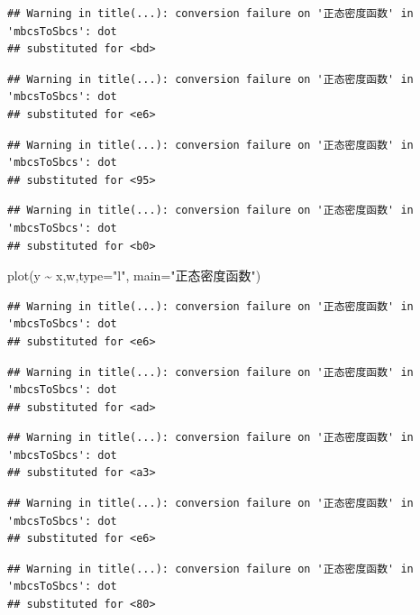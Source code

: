 \documentclass[
]{book}
\newenvironment{Shaded}{\begin{snugshade}}{\end{snugshade}}
\newcommand{\AttributeTok}[1]{\textcolor[rgb]{0.77,0.63,0.00}{#1}}
\newcommand{\FunctionTok}[1]{\textcolor[rgb]{0.00,0.00,0.00}{#1}}
\newcommand{\NormalTok}[1]{#1}
\newcommand{\SpecialCharTok}[1]{\textcolor[rgb]{0.00,0.00,0.00}{#1}}
\newcommand{\StringTok}[1]{\textcolor[rgb]{0.31,0.60,0.02}{#1}}
\begin{document}
\begin{verbatim}
## Warning in title(...): conversion failure on '正态密度函数' in 'mbcsToSbcs': dot
## substituted for <bd>
\end{verbatim}

\begin{verbatim}
## Warning in title(...): conversion failure on '正态密度函数' in 'mbcsToSbcs': dot
## substituted for <e6>
\end{verbatim}

\begin{verbatim}
## Warning in title(...): conversion failure on '正态密度函数' in 'mbcsToSbcs': dot
## substituted for <95>
\end{verbatim}

\begin{verbatim}
## Warning in title(...): conversion failure on '正态密度函数' in 'mbcsToSbcs': dot
## substituted for <b0>
\end{verbatim}

\begin{Shaded}
\begin{Highlighting}[]
\FunctionTok{plot}\NormalTok{(y }\SpecialCharTok{\textasciitilde{}}\NormalTok{ x,w,}\AttributeTok{type=}\StringTok{"l"}\NormalTok{, }\AttributeTok{main=}\StringTok{"正态密度函数"}\NormalTok{)}
\end{Highlighting}
\end{Shaded}

\begin{verbatim}
## Warning in title(...): conversion failure on '正态密度函数' in 'mbcsToSbcs': dot
## substituted for <e6>
\end{verbatim}

\begin{verbatim}
## Warning in title(...): conversion failure on '正态密度函数' in 'mbcsToSbcs': dot
## substituted for <ad>
\end{verbatim}

\begin{verbatim}
## Warning in title(...): conversion failure on '正态密度函数' in 'mbcsToSbcs': dot
## substituted for <a3>
\end{verbatim}

\begin{verbatim}
## Warning in title(...): conversion failure on '正态密度函数' in 'mbcsToSbcs': dot
## substituted for <e6>
\end{verbatim}

\begin{verbatim}
## Warning in title(...): conversion failure on '正态密度函数' in 'mbcsToSbcs': dot
## substituted for <80>
\end{verbatim}
\end{document}
